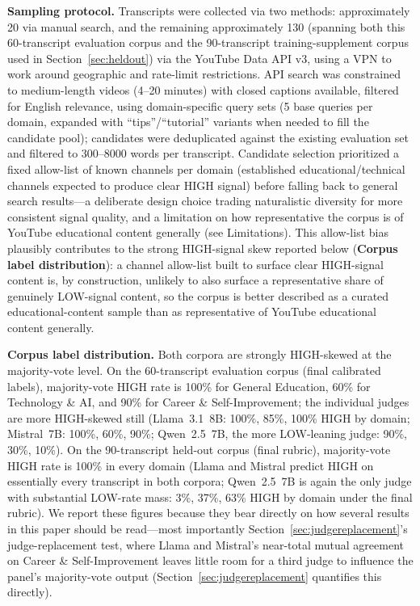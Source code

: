 \documentclass[11pt]{article}
\begin{document}
\textbf{Sampling protocol.} Transcripts were collected via two methods:
approximately 20 via manual search, and the remaining approximately 130
(spanning both this 60-transcript evaluation corpus and the 90-transcript
training-supplement corpus used in Section~\ref{sec:heldout}) via the
YouTube Data API v3, using a VPN to work around geographic and rate-limit
restrictions. API search was constrained to medium-length videos
(4--20 minutes) with closed captions available, filtered for English
relevance, using domain-specific query sets (5 base queries per domain,
expanded with ``tips''/``tutorial'' variants when needed to fill the
candidate pool); candidates were deduplicated against the existing
evaluation set and filtered to 300--8000 words per transcript. Candidate
selection prioritized a fixed allow-list of known channels per domain
(established educational/technical channels expected to produce clear HIGH
signal) before falling back to general search results---a
deliberate design choice trading naturalistic diversity for more
consistent signal quality, and a limitation on how representative the
corpus is of YouTube educational content generally (see Limitations). This
allow-list bias plausibly contributes to the strong HIGH-signal skew
reported below (\textbf{Corpus label distribution}): a channel allow-list
built to surface clear HIGH-signal content is, by construction, unlikely
to also surface a representative share of genuinely LOW-signal content, so
the corpus is better described as a curated educational-content sample
than as representative of YouTube educational content generally.

\textbf{Corpus label distribution.} Both corpora are strongly HIGH-skewed
at the majority-vote level. On the 60-transcript evaluation corpus (final
calibrated labels), majority-vote HIGH rate is 100\% for General Education,
60\% for Technology \& AI, and 90\% for Career \& Self-Improvement; the
individual judges are more HIGH-skewed still (Llama~3.1~8B: 100\%, 85\%,
100\% HIGH by domain; Mistral~7B: 100\%, 60\%, 90\%; Qwen~2.5~7B, the more
LOW-leaning judge: 90\%, 30\%, 10\%). On the 90-transcript held-out corpus
(final rubric), majority-vote HIGH rate is 100\% in every domain (Llama and
Mistral predict HIGH on essentially every transcript in both corpora;
Qwen~2.5~7B is again the only judge with substantial LOW-rate mass:
3\%, 37\%, 63\% HIGH by domain under the final rubric). We report these
figures because they bear directly on how several results in this paper
should be read---most importantly Section~\ref{sec:judgereplacement}'s
judge-replacement test, where Llama and Mistral's near-total mutual
agreement on Career \& Self-Improvement leaves little room for a third
judge to influence the panel's majority-vote output (Section~\ref{sec:judgereplacement}
quantifies this directly).
\end{document}
